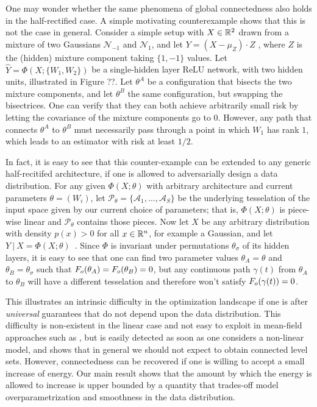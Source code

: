 One may wonder whether the same phenomena of global connectedness also holds 
in the half-rectified case. A simple motivating counterexample shows that this is not the case in 
general. Consider a simple setup with $X \in {\mathbb{R}}^2$ drawn from a mixture of two Gaussians $\mathcal{N}_{-1}$ 
and $\mathcal{N}_{1}$, and let $Y = (X-\mu_Z) \cdot Z $ , where $Z$ is the (hidden) mixture component taking $\{1,-1\}$ values.  Let 
$\hat{Y} = \Phi(X; \{ W_1, W_2\} )$ be a single-hidden layer ReLU network, with two hidden units, 
illustrated in Figure ??. 
Let $\theta^A$ be a configuration that bisects the two mixture components, 
and let $\theta^B$ the same configuration, but swapping the bisectrices. 
One can verify that they can both achieve arbitrarily small risk by letting the covariance of the mixture components go to $0$. 
However, any path that connects $\theta^A$ to $\theta^B$ 
must necessarily pass through a point in which $W_1$ has rank $1$, which leads to an estimator with risk at least $1/2$.  

In fact, it is easy to see that this counter-example can be extended to any generic half-recitifed architecture, if one is 
allowed to adversarially design a data distribution. For any given $\Phi(X; \theta)$ with arbitrary architecture and current parameters 
$\theta = (W_i)$, let $\mathcal{P}_\theta=\{ \mathcal{A}_1, \dots, \mathcal{A}_S\}$ be the underlying tesselation of the input space given by our current choice of parameters; that is, $\Phi(X; \theta)$ is piece-wise linear and $\mathcal{P}_\theta$ contains those pieces. Now let 
$X$ be any arbitrary distribution with density $p(x) > 0$ for all $x \in {\mathbb{R}}^n$, for example a Gaussian, and let %
$Y ~|~X = \Phi(X ; \theta)$~. Since $\Phi$ is invariant under permutations $\theta_\sigma$ of its hidden layers, it is easy to see that one can find two parameter values $\theta_A = \theta$ and $\theta_B = \theta_\sigma$ such that $F_{o}(\theta_A) = F_{o}(\theta_B) = 0$, but any continuous path $\gamma(t)$ from $\theta_A$ to $\theta_B$ will have a different tesselation and therefore won't satisfy $F_{o}( \gamma(t) ) = 0$. 
 
This illustrates an intrinsic difficulty in the optimization landscape if one is after \emph{universal} 
guarantees that do not depend upon the data distribution. This difficulty is non-existent in the linear case 
and not easy to exploit in mean-field approaches such as \cite{choromaska}, but 
is easily detected as soon as one considers a non-linear model, and shows that in general 
we should not expect to obtain connected level sets. However, 
connectedness can be recovered if one is willing to accept a small increase 
of energy. Our main result shows that the amount by which the energy is 
allowed to increase is upper bounded by a quantity that trades-off model overparametrization 
and smoothness in the data distribution.

